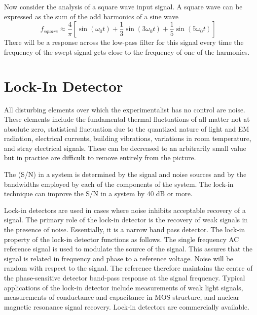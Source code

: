 Now consider the analysis of a square wave input signal. A square wave can be expressed as the sum of the odd harmonics of a sine wave \begin{equation*}
    f_{square} \approx \frac{4}{\pi}\left[\sin(\omega_0t) + \frac{1}{3}\sin(3\omega_0t) + \frac{1}{5}\sin(5\omega_0t)\right]
\end{equation*}
There will be a response across the low-pass filter for this signal every time the frequency of the swept signal gets close to the frequency of one of the harmonics.





\chapter{Lock-In Detector}

\begin{defn}[Noise]
    All disturbing elements over which the experimentalist has no control are noise. These elements include the fundamental thermal fluctuations of all matter not at absolute zero, statistical fluctuation due to the quantized nature of light and EM radiation, electrical currents, building vibrations, variations in room temperature, and stray electrical signals. These can be decreased to an arbitrarily small value but in practice are difficult to remove entirely from the picture.
\end{defn}

\begin{defn}
    The  (S/N) in a system is determined by the signal and noise sources and by the bandwidths employed by each of the components of the system. The lock-in technique can improve the S/N in a system by 40 dB or more.
\end{defn}

Lock-in detectors are used in cases where noise inhibits acceptable recovery of a signal. The primary role of the lock-in detector is the recovery of weak signals in the presence of noise. Essentially, it is a narrow band pass detector. The lock-in property of the lock-in detector functions as follows. The single frequency AC reference signal is used to modulate the source of the signal. This assures that the signal is related in frequency and phase to a reference voltage. Noise will be random with respect to the signal. The reference therefore maintains the centre of the phase-sensitive detector band-pass response at the signal frequency. Typical applications of the lock-in detector include measurements of weak light signals, measurements of conductance and capacitance in MOS structure, and nuclear magnetic resonance signal recovery. Lock-in detectors are commercially available. 

